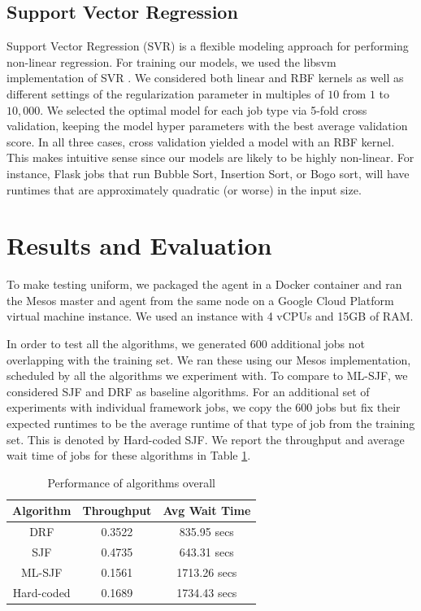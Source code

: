 \documentclass{hotnets19}
\begin{document}
\subsection{Support Vector Regression}
Support Vector Regression (SVR) is a flexible modeling approach for performing non-linear regression. For training our models, we used the libsvm implementation of SVR \cite{chang2011libsvm}. We considered both linear and RBF kernels as well as different settings of the regularization parameter in multiples of $10$ from $1$ to $10,000$. We selected the optimal model for each job type via 5-fold cross validation, keeping the model hyper parameters with the best average validation score. In all three cases, cross validation yielded a model with an RBF kernel. This makes intuitive sense since our models are likely to be highly non-linear. For instance, Flask jobs that run Bubble Sort, Insertion Sort, or Bogo sort, will have runtimes that are approximately quadratic (or worse) in the input size.

\section{Results and Evaluation}

To make testing uniform, we packaged the agent in a Docker container and ran the Mesos master and agent from the same node on a Google Cloud Platform virtual machine instance. 
We used an instance with 4 vCPUs and 15GB of RAM.

In order to test all the algorithms, we generated 600 additional jobs not overlapping with the training set. 
We ran these using our Mesos implementation, scheduled by all the algorithms we experiment with.
To compare to ML-SJF, we considered SJF and DRF as baseline algorithms.
For an additional set of experiments with individual framework jobs, we copy the 600 jobs but fix their expected runtimes to be the average runtime of that type of job from the training set.
This is denoted by Hard-coded SJF. 
We report the throughput and average wait time of jobs for these algorithms in Table \ref{all-jobs}. 

\vspace{0.3cm}

\begin{table}[!tbh]
\centering
\begin{tabular}{|c|c|c|}
    \hline
    \textbf{Algorithm} & \textbf{Throughput} & \textbf{Avg Wait Time} \\\hline
    DRF & 0.3522 & 835.95 secs \\\hline
    SJF & 0.4735 & 643.31 secs \\\hline
    ML-SJF & 0.1561 & 1713.26 secs \\\hline
    Hard-coded & 0.1689 & 1734.43 secs \\\hline
\end{tabular}
\caption{Performance of algorithms overall}
\label{all-jobs}
\end{table}
\end{document}
